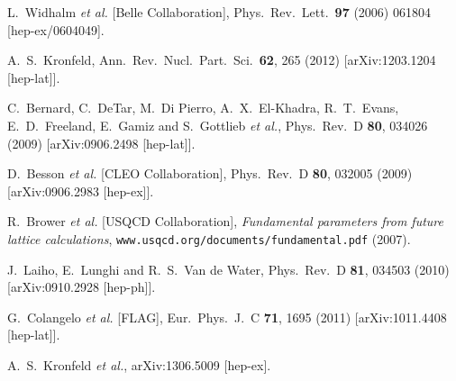 \begin{thebibliography}{99}
  L.~Widhalm {\it et al.}  [Belle Collaboration],
  Phys.\ Rev.\ Lett.\  {\bf 97} (2006) 061804
  [hep-ex/0604049].
  
  A.~S.~Kronfeld,
  Ann.\ Rev.\ Nucl.\ Part.\ Sci.\  {\bf 62}, 265 (2012)
  [arXiv:1203.1204 [hep-lat]].
  
  C.~Bernard, C.~DeTar, M.~Di Pierro, A.~X.~El-Khadra, R.~T.~Evans, E.~D.~Freeland, E.~Gamiz and S.~Gottlieb {\it et al.},
  Phys.\ Rev.\ D {\bf 80}, 034026 (2009)
  [arXiv:0906.2498 [hep-lat]].
  
  D.~Besson {\it et al.}  [CLEO Collaboration],
  Phys.\ Rev.\ D {\bf 80}, 032005 (2009)
  [arXiv:0906.2983 [hep-ex]].
  
R.~Brower {\em et al.} [USQCD Collaboration],
{\em Fundamental parameters from future lattice  calculations},
{\tt www.usqcd.org/documents/fundamental.pdf} (2007).

  J.~Laiho, E.~Lunghi and R.~S.~Van de Water,
  Phys.\ Rev.\ D {\bf 81}, 034503 (2010)
  [arXiv:0910.2928 [hep-ph]].

  G.~Colangelo {\it et al.} [FLAG],
  Eur.\ Phys.\ J.\ C {\bf 71}, 1695 (2011)
  [arXiv:1011.4408 [hep-lat]].
  
  
  A.~S.~Kronfeld {\it et al.},
  arXiv:1306.5009 [hep-ex].
 

\end{thebibliography}
